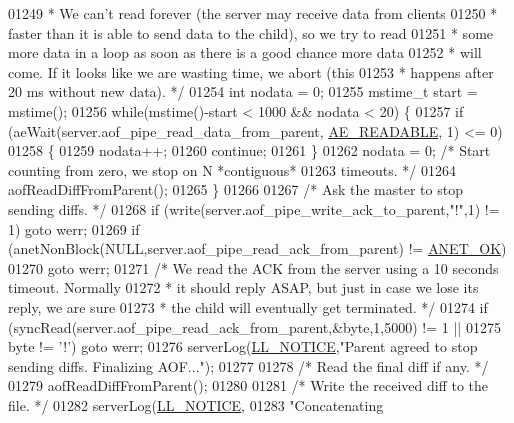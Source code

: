 \begin{DoxyCode}
{{{{{{{{{{{{{{{{{{01249 \textcolor{comment}{     * We can't read forever (the server may receive data from clients}
01250 \textcolor{comment}{     * faster than it is able to send data to the child), so we try to read}
01251 \textcolor{comment}{     * some more data in a loop as soon as there is a good chance more data}
01252 \textcolor{comment}{     * will come. If it looks like we are wasting time, we abort (this}
01253 \textcolor{comment}{     * happens after 20 ms without new data). */}
01254     \textcolor{keywordtype}{int} nodata = 0;
01255     mstime\_t start = mstime();
01256     \textcolor{keywordflow}{while}(mstime()-start < 1000 && nodata < 20) \{
01257         \textcolor{keywordflow}{if} (aeWait(server.aof\_pipe\_read\_data\_from\_parent, \hyperlink{ae_8h_a7a9a2162d007d09739955b4e55c65bf3}{AE\_READABLE}, 1) <= 0)
01258         \{
01259             nodata++;
01260             \textcolor{keywordflow}{continue};
01261         \}
01262         nodata = 0; \textcolor{comment}{/* Start counting from zero, we stop on N *contiguous*}
01263 \textcolor{comment}{                       timeouts. */}
01264         aofReadDiffFromParent();
01265     \}
01266 
01267     \textcolor{comment}{/* Ask the master to stop sending diffs. */}
01268     \textcolor{keywordflow}{if} (write(server.aof\_pipe\_write\_ack\_to\_parent,\textcolor{stringliteral}{"!"},1) != 1) \textcolor{keywordflow}{goto} werr;
01269     \textcolor{keywordflow}{if} (anetNonBlock(NULL,server.aof\_pipe\_read\_ack\_from\_parent) != \hyperlink{anet_8h_a25fb91ccc6457153f6d2e21380d4c6cf}{ANET\_OK})
01270         \textcolor{keywordflow}{goto} werr;
01271     \textcolor{comment}{/* We read the ACK from the server using a 10 seconds timeout. Normally}
01272 \textcolor{comment}{     * it should reply ASAP, but just in case we lose its reply, we are sure}
01273 \textcolor{comment}{     * the child will eventually get terminated. */}
01274     \textcolor{keywordflow}{if} (syncRead(server.aof\_pipe\_read\_ack\_from\_parent,&byte,1,5000) != 1 ||
01275         byte != \textcolor{stringliteral}{'!'}) \textcolor{keywordflow}{goto} werr;
01276     serverLog(\hyperlink{server_8h_a8c54c191e436c7dd3012167212692401}{LL\_NOTICE},\textcolor{stringliteral}{"Parent agreed to stop sending diffs. Finalizing AOF..."});
01277 
01278     \textcolor{comment}{/* Read the final diff if any. */}
01279     aofReadDiffFromParent();
01280 
01281     \textcolor{comment}{/* Write the received diff to the file. */}
01282     serverLog(\hyperlink{server_8h_a8c54c191e436c7dd3012167212692401}{LL\_NOTICE},
01283         \textcolor{stringliteral}{"Concatenating %
}}}}}}}}}}}}}}}}}}}
\end{DoxyCode}
